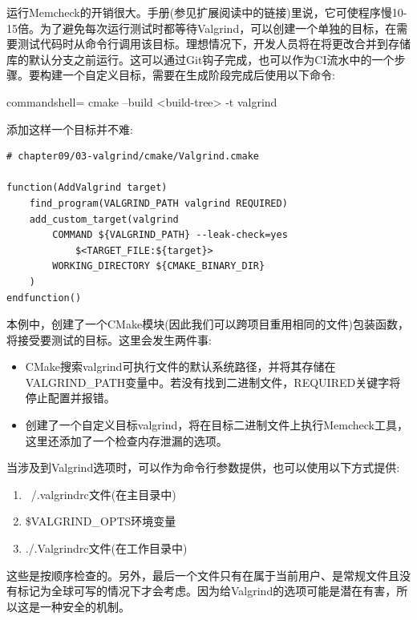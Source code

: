 运行Memcheck的开销很大。手册(参见扩展阅读中的链接)里说，它可使程序慢10-15倍。为了避免每次运行测试时都等待Valgrind，可以创建一个单独的目标，在需要测试代码时从命令行调用该目标。理想情况下，开发人员将在将更改合并到存储库的默认分支之前运行。这可以通过Git钩子完成，也可以作为CI流水中的一个步骤。要构建一个自定义目标，需要在生成阶段完成后使用以下命令:

\begin{tcblisting}{commandshell={}}
cmake --build <build-tree> -t valgrind
\end{tcblisting}

添加这样一个目标并不难:

\begin{lstlisting}[style=styleCMake]
# chapter09/03-valgrind/cmake/Valgrind.cmake

function(AddValgrind target)
	find_program(VALGRIND_PATH valgrind REQUIRED)
	add_custom_target(valgrind
		COMMAND ${VALGRIND_PATH} --leak-check=yes
			$<TARGET_FILE:${target}>
		WORKING_DIRECTORY ${CMAKE_BINARY_DIR}
	)
endfunction()
\end{lstlisting}

本例中，创建了一个CMake模块(因此我们可以跨项目重用相同的文件)包装函数，将接受要测试的目标。这里会发生两件事:

\begin{itemize}
\item 
CMake搜索valgrind可执行文件的默认系统路径，并将其存储在VALGRIND\_PATH变量中。若没有找到二进制文件，REQUIRED关键字将停止配置并报错。

\item 
创建了一个自定义目标valgrind，将在目标二进制文件上执行Memcheck工具，这里还添加了一个检查内存泄漏的选项。
\end{itemize}

当涉及到Valgrind选项时，可以作为命令行参数提供，也可以使用以下方式提供:

\begin{enumerate}
\item 
~/.valgrindrc文件(在主目录中)

\item 
\$VALGRIND\_OPTS环境变量

\item 
./.Valgrindrc文件(在工作目录中)
\end{enumerate}

这些是按顺序检查的。另外，最后一个文件只有在属于当前用户、是常规文件且没有标记为全球可写的情况下才会考虑。因为给Valgrind的选项可能是潜在有害，所以这是一种安全的机制。


